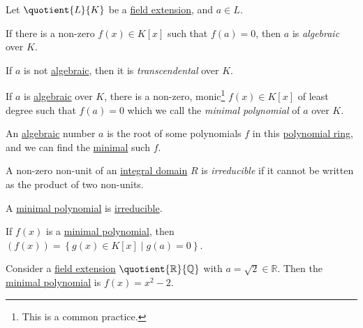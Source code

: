 \begin{definition*}
	Let \(\quotient{L}{K} \) be a \hyperref[def:field-extension]{field extension}, and \(a\in L\).
	\begin{definition}[Algebraic]\label{def:algebraic}
		If there is a non-zero \(f(x)\in K[x]\) such that \(f(a) = 0\), then \(a\) is \emph{algebraic} over \(K\).
	\end{definition}

	\begin{definition}[Transcendental]\label{def:transcendental}
		If \(a\) is not \hyperref[def:algebraic]{algebraic}, then it is \emph{transcendental} over \(K\).
	\end{definition}
\end{definition*}

\begin{definition}\label{def:minimal-polynomial}
	If \(a\) is \hyperref[def:algebraic]{algebraic} over \(K\), there is a non-zero, monic\footnote{This is a common practice.} \(f(x)\in K[x]\) of least degree such that \(f(a) = 0\) which we call the \emph{minimal polynomial} of \(a\) over \(K\).
\end{definition}

\begin{intuition}
	An \hyperref[def:algebraic]{algebraic} number \(a\) is the root of some polynomials \(f\) in this \hyperref[def:polynomial-ring]{polynomial ring}, and we can find the \hyperref[def:minimal-polynomial]{minimal} such \(f\).
\end{intuition}

\begin{prev}[Irreducible]\label{prev:irreducible}
	A non-zero non-unit of an \hyperref[def:integral-domain]{integral domain} \(R\) is \emph{irreducible} if it cannot be written as the product of two non-units.
\end{prev}

\begin{note}
	A \hyperref[def:minimal-polynomial]{minimal polynomial} is \hyperref[prev:irreducible]{irreducible}.
\end{note}

\begin{remark}
	If \(f(x)\) is a \hyperref[def:minimal-polynomial]{minimal polynomial}, then \((f(x)) = \left\{ g(x)\in K[x] \mid g(a) = 0 \right\}\).
\end{remark}
\begin{eg}
	Consider a \hyperref[def:field-extension]{field extension} \(\quotient{\mathbb{R} }{\mathbb{Q} } \) with \(a = \sqrt{2} \in \mathbb{R} \). Then the \hyperref[def:minimal-polynomial]{minimal polynomial} is \(f(x) = x^2 - 2\).
\end{eg}


